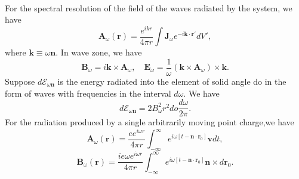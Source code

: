 \\
For the spectral resolution of the field of the waves radiated by the system, we have
\[\bm{A}_{\omega}(\bm{r}) =  \frac{e^{ikr}}{4\pi r} \int \bm{J}_{\omega} e^{-i\bm{k}\cdot\bm{r}'} dV',\]
where $\bm{k} \equiv \omega\bm{n}$.
In wave zone, we have
\[\bm{B}_{\omega} = i\bm{k} \times \bm{A}_{\omega} , \quad \bm{E}_{\omega} = \frac{1}{\omega} \left( \bm{k} \times \bm{A}_{\omega}\right) \times \bm{k}.\]
Suppose $d\mathcal{E}_{\omega\bm{n}}$ is the energy radiated into the element of solid angle do in the form of waves with frequencies in the interval $d\omega$. We have
\[d\mathcal{E}_{\omega\bm{n}} = 2B_{\omega}^2 r^2 do \frac{d\omega}{2\pi}.\]
For the radiation produced by a single arbitrarily moving point charge,we have
\[\bm{A}_{\omega}(\bm{r}) = \frac{e e^{i\omega
r}}{4\pi r}  \int_{-\infty}^{\infty} e^{i\omega[
t-\bm{n}\cdot\bm{r}_0]} \bm{v} dt,\]
\[\bm{B}_{\omega}(\bm{r}) = \frac{ie\omega e^{i\omega
r}}{4\pi r}  \int_{-\infty}^{\infty} e^{i\omega[
t-\bm{n}\cdot\bm{r}_0]}  \bm{n} \times d\bm{r}_0.\]

